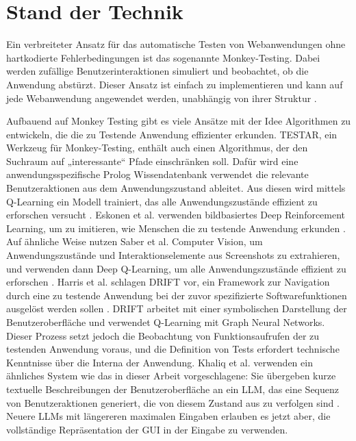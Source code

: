 \chapter{Stand der Technik}
\label{ch:RelatedWork}

Ein verbreiteter Ansatz für das automatische Testen von Webanwendungen ohne hartkodierte Fehlerbedingungen ist das sogenannte Monkey-Testing.
Dabei werden zufällige Benutzerinteraktionen simuliert und beobachtet, ob die Anwendung abstürzt.
Dieser Ansatz ist einfach zu implementieren und kann auf jede Webanwendung angewendet werden, unabhängig von ihrer Struktur \cite{monkey_testing}.

Aufbauend auf Monkey Testing gibt es viele Ansätze mit der Idee Algorithmen zu entwickeln, die die zu Testende Anwendung effizienter erkunden.
TESTAR, ein Werkzeug für Monkey-Testing, enthält auch einen Algorithmus, der den Suchraum auf „interessante“ Pfade einschränken soll.
Dafür wird eine anwendungsspezifische Prolog Wissendatenbank verwendet die relevante Benutzeraktionen aus dem Anwendungszustand ableitet.
Aus diesen wird mittels Q-Learning ein Modell trainiert, das alle Anwendungszustände effizient zu erforschen versucht \cite{testar-q-learning}.
Eskonen et al. verwenden bildbasiertes Deep Reinforcement Learning, um zu imitieren, wie Menschen die zu testende Anwendung erkunden \cite{deep_reinforcement_exploring}.
Auf ähnliche Weise nutzen Saber et al. Computer Vision, um Anwendungszustände und Interaktionselemente aus Screenshots zu extrahieren, und verwenden dann Deep Q-Learning, um alle Anwendungszustände effizient zu erforschen \cite{saber_testing}. 
Harris et al. schlagen DRIFT vor, ein Framework zur Navigation durch eine zu testende Anwendung bei der zuvor spezifizierte Softwarefunktionen ausgelöst werden sollen \cite{harries2020drift}.
DRIFT arbeitet mit einer symbolischen Darstellung der Benutzeroberfläche und verwendet Q-Learning mit Graph Neural Networks.
Dieser Prozess setzt jedoch die Beobachtung von Funktionsaufrufen der zu testenden Anwendung voraus, und die Definition von Tests erfordert technische Kenntnisse über die Interna der Anwendung.
Khaliq et al. verwenden ein ähnliches System wie das in dieser Arbeit vorgeschlagene: Sie übergeben kurze textuelle Beschreibungen der Benutzeroberfläche an ein LLM, das eine Sequenz von Benutzeraktionen generiert, die von diesem Zustand aus zu verfolgen sind \cite{transformers_exploratory}.
Neuere LLMs mit längereren maximalen Eingaben erlauben es jetzt aber, die vollständige Repräsentation der GUI in der Eingabe zu verwenden.

